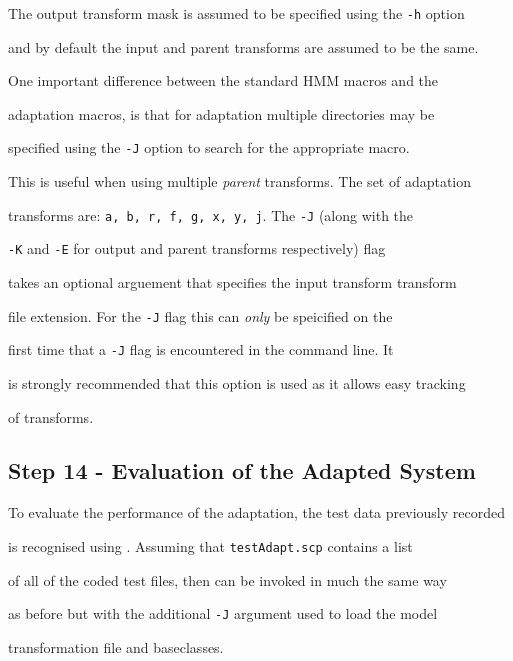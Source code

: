 The output transform mask is assumed to be specified using the {\tt -h} option


and by default the input and parent transforms are assumed to be the same.








One important difference between the standard HMM macros and the


adaptation macros, is that for adaptation multiple directories may be


specified using the {\tt -J} option to search for the appropriate macro. 


This is useful when using multiple {\em parent} transforms. The set of adaptation


transforms are: {\tt a, b, r, f, g, x, y, j}. The {\tt -J} (along with the


{\tt -K} and {\tt -E} for output and parent transforms respectively) flag 


takes an optional arguement that specifies the input transform transform


file extension. For the {\tt -J} flag this can {\em only} be speicified on the


first time that a {\tt -J} flag is encountered in the command line. It


is strongly recommended that this option is used as it allows easy tracking


of transforms.





\subsection{Step 14 - Evaluation of the Adapted System}





To evaluate the performance of the adaptation, the test data previously recorded 


is recognised using . Assuming that \texttt{testAdapt.scp} contains a list 


of all of the coded test files, then  can be invoked in much the same way 


as before but with the additional \texttt{-J} argument used to load the model 


transformation file and  baseclasses.





